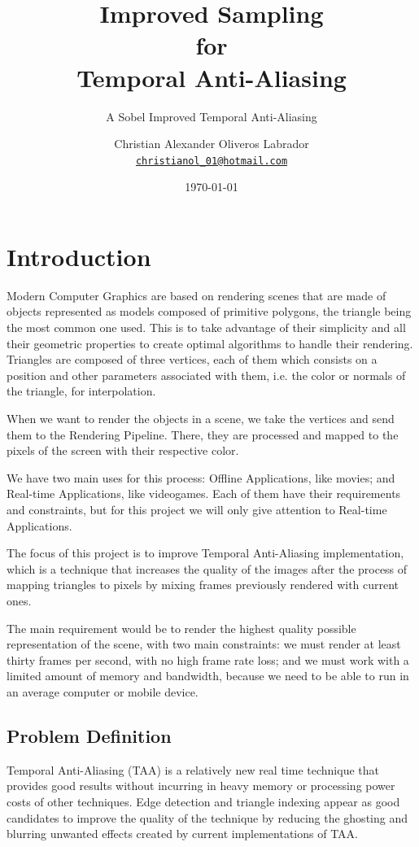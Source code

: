 \documentclass{cslthse-msc}
\author{
	Christian Alexander Oliveros Labrador \\
	{\normalsize \href{mailto:christianol_01@hotmail.com}{\texttt{christianol\_01@hotmail.com}}}
}
\title{Improved Sampling \\for \\Temporal Anti-Aliasing}
\subtitle{A Sobel Improved Temporal Anti-Aliasing}
\date{\today}
\begin{document}
\makefrontmatter
\chapter[Introduction]{Introduction}
Modern Computer Graphics are based on rendering scenes that are made of objects represented as models composed of primitive polygons, the triangle being the most common one used. This is to take advantage of their simplicity and all their geometric properties to create optimal algorithms to handle their rendering. Triangles are composed of three vertices, each of them which consists on a position and other parameters associated with them, i.e. the color or normals of the triangle, for interpolation.
 
When we want to render the objects in a scene, we take the vertices and send them to the Rendering Pipeline. There, they are processed and mapped to the pixels of the screen with their respective color.

We have two main uses for this process: Offline Applications, like movies; and Real-time Applications, like videogames. Each of them have their requirements and constraints, but for this project we will only give attention to Real-time Applications.

The focus of this project is to improve Temporal Anti-Aliasing implementation, which is a technique that increases the quality of the images after the process of mapping triangles to pixels by mixing frames previously rendered with current ones.

The main requirement would be to render the highest quality possible representation of the scene, with two main constraints: we must render at least thirty frames per second, with no high frame rate loss; and we must work with a limited amount of memory and bandwidth, because we need to be able to run in an average computer or mobile device. \cite{Doggett2017EDAN35, Shreiner2011}

\section{Problem Definition}
Temporal Anti-Aliasing (TAA) is a relatively new real time technique that provides good results without incurring in heavy memory or processing power costs of other techniques. Edge detection and triangle indexing appear as good candidates to improve the quality of the technique by reducing the ghosting and blurring unwanted effects created by current implementations of TAA. 
\end{document}
